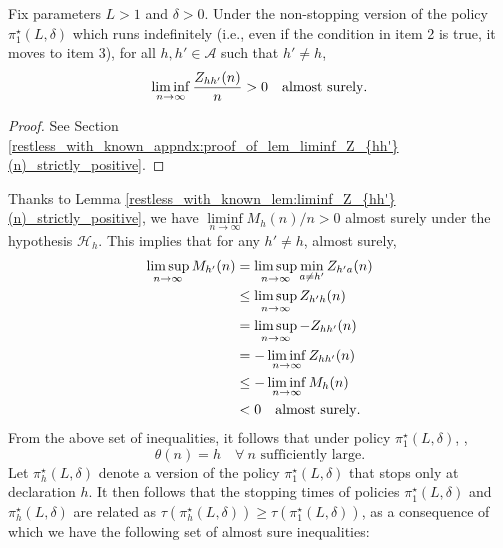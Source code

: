 \begin{lemma}\label{restless_with_known_lem:liminf_Z_{hh'}(n)_strictly_positive}
	Fix parameters $L>1$ and $\delta>0$. Under the non-stopping version of the policy $\pi_1^\star(L,\delta)$ which runs indefinitely (i.e., even if the condition in item 2 is true, it moves to item 3), for all $h, h'\in \mathcal{A}$ such that $h'\neq h$,
	\begin{equation}
		\liminf\limits_{n\to\infty}\frac{Z_{hh'}(n)}{n}>0\quad \text{almost surely}.\label{restless_with_known_eq:liminf_Z_{hh'}(n)_strictly_positive}
	\end{equation}
\end{lemma}
\begin{proof}
See Section \ref{restless_with_known_appndx:proof_of_lem_liminf_Z_{hh'}(n)_strictly_positive}.	
\end{proof}
Thanks to Lemma \ref{restless_with_known_lem:liminf_Z_{hh'}(n)_strictly_positive}, we have $\liminf\limits_{n\to\infty}M_h(n)/n >0$ almost surely under the hypothesis $\mathcal{H}_h$. This implies that for any $h'\neq h$, almost surely,  
\begin{align}
	\limsup\limits_{n\to\infty}M_{h'}(n)&=\limsup\limits_{n\to\infty}\min\limits_{a\neq h'}Z_{h'a}(n)\nonumber\\
	&\leq \limsup\limits_{n\to\infty}Z_{h'h}(n)\nonumber\\
	&=\limsup\limits_{n\to\infty}-Z_{hh'}(n)\nonumber\\
	&= -\liminf\limits_{n\to\infty}Z_{hh'}(n)\nonumber\\
	&\leq -\liminf\limits_{n\to\infty}M_{h}(n)\nonumber\\
	&<0\quad \text{\text{almost surely}}.
	\label{restless_with_known_eq:limsup_M_{h'}(n)_less_than_0}
\end{align}
From the above set of inequalities, it follows that under policy $\pi_1^\star(L,\delta)$, ,
 \begin{equation}
 	\theta(n)=h\quad \forall~n\text{ sufficiently large}.\label{restless_with_known_eq:h^*(n)_equal_to_h_almost_surely}
 \end{equation}
Let $\pi^\star_h(L,\delta)$ denote a version of the policy $\pi_1^\star(L, \delta)$ that stops only at declaration $h$. It then follows that the stopping times of policies $\pi_1^\star(L,\delta)$ and $\pi^\star_h(L,\delta)$ are  related as $\tau(\pi^\star_h(L,\delta))\geq \tau(\pi_1^\star(L,\delta))$, as a consequence of which we have the following set of almost sure inequalities:
